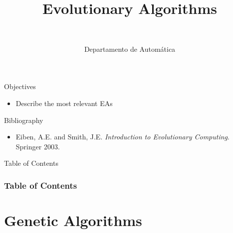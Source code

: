 \documentclass[10pt,compress]{beamer} %
\title[Evolutionary Algorithms]{Evolutionary Algorithms}
\author{\asignatura\\\carrera}
\institute{}
\date{Departamento de Automática}
\begin{document}
{\titlepageBlue
    \begin{frame}
        \titlepage
    \end{frame}
}

\begin{frame}[plain]{}
   \begin{block}{Objectives}
       \begin{itemize}
        \item Describe the most relevant EAs
       \end{itemize}
   \end{block}

   \begin{block}{Bibliography}
    \begin{itemize}
         \item Eiben, A.E. and Smith, J.E. \emph{Introduction to Evolutionary Computing}. Springer 2003.
	\end{itemize}
   \end{block}
\end{frame}

{
\begin{frame}[shrink]{Table of Contents}
 \frametitle{Table of Contents}
 \tableofcontents
\end{frame}
}

\section{Genetic Algorithms}
\end{document}
